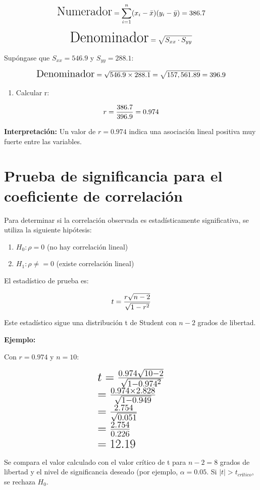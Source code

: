 \documentclass[
  spanish,
  letterpaper,
]{book}
\providecommand{\tightlist}{%
  \setlength{\itemsep}{0pt}\setlength{\parskip}{0pt}}
\begin{document}
\[\LARGE \text{Numerador} = \sum_{i=1}^{n} (x_i - \bar{x})(y_i - \bar{y}) = 386.7\]

\[\huge \text{Denominador} = \sqrt{S_{xx} \cdot S_{yy}} \]

Supóngase que \(S_{xx} = 546.9\) y \(S_{yy} = 288.1\):

\[\Large \text{Denominador} = \sqrt{546.9 \times 288.1} = \sqrt{157,561.89} = 396.9  \]

\begin{enumerate}
\def\labelenumi{\arabic{enumi}.}
\setcounter{enumi}{2}
\tightlist
\item
  Calcular r:
\end{enumerate}

\[\huge r = \frac{386.7}{396.9} = 0.974\]

\textbf{Interpretación:} Un valor de \(r = 0.974\) indica una asociación
lineal positiva muy fuerte entre las variables.

\section{Prueba de significancia para el coeficiente de
correlación}\label{prueba-de-significancia-para-el-coeficiente-de-correlaciuxf3n}

Para determinar si la correlación observada es estadísticamente
significativa, se utiliza la siguiente hipótesis:

\begin{enumerate}
\def\labelenumi{\arabic{enumi}.}
\item
  \(H_0: \rho = 0\) (no hay correlación lineal)
\item
  \(H_1: \rho \neq =0\) (existe correlación lineal)
\end{enumerate}

El estadístico de prueba es:

\[\huge t = \frac{r \sqrt{n-2}}{\sqrt{1 - r^2}}\]

Este estadístico sigue una distribución t de Student con \(n-2\) grados
de libertad.

\textbf{Ejemplo:}

Con \(r = 0.974\) y \(n = 10\):

\[
\LARGE
\begin{array}{l}
t = \frac{0.974 \sqrt{10-2}}{\sqrt{1 - 0.974^2}}  \\
= \frac{0.974 \times 2.828}{\sqrt{1 - 0.949}} \\
= \frac{2.754}{\sqrt{0.051}} \\
= \frac{2.754}{0.226} \\
= 12.19
\end{array}
\] Se compara el valor calculado con el valor crítico de t para
\(n-2 = 8\) grados de libertad y el nivel de significancia deseado (por
ejemplo, \(\alpha = 0.05\). Si \(|t| > t_{crítico}\), se rechaza
\(H_0\).
\end{document}
